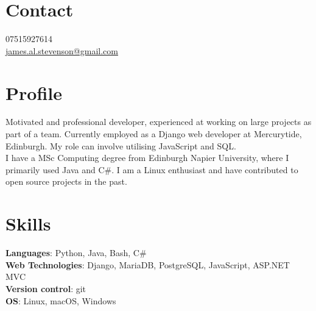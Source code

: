 \documentclass[12pt, a4paper]{article}
\begin{document}
\par{\bigskip\par
\section{Contact}
\large
07515927614\\
\href{mailto:james.al.stevenson@gmail.com}{james.al.stevenson@gmail.com}\\
}

\begin{multicols}{2}

\section{Profile}
\noindent Motivated and professional developer, experienced at working on large projects as part of a team. Currently employed as a Django web developer at Mercurytide, Edinburgh. My role can involve utilising JavaScript and SQL.\\
I have a MSc Computing degree from Edinburgh Napier University, where I primarily used Java and C\#. I am a Linux enthusiast and have contributed to open source projects in the past.

\section{Skills}
\small
\noindent\textbf{Languages}: Python, Java, Bash, C\#\\
\textbf{Web Technologies}: Django, MariaDB, PostgreSQL, JavaScript, ASP.NET MVC\\
\textbf{Version control}: git\\
\textbf{OS}: Linux, macOS, Windows


\end{multicols}
\end{document}
